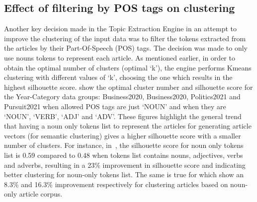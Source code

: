 \subsection{Effect of filtering by POS tags on clustering} \label{s:pos_clustering}
Another key decision made in the Topic Extraction Engine in an attempt to improve the clustering of the input data was to filter the tokens extracted from the articles by their Part-Of-Speech (POS) tags. The decision was made to only use nouns tokens to represent each article. As mentioned earlier, in order to obtain the optimal number of clusters (optimal `k'), the engine performs Kmeans clustering with different values of `k', choosing the one which results in the highest silhouette score.  show the optimal cluster number and silhouette score for the Year-Category data groups: Business2020, Business2020, Politics2021 and Pursuit2021 when allowed POS tags are just `NOUN' and when they are `NOUN', `VERB', `ADJ' and `ADV'. These figures highlight the general trend that having a noun only tokens list to represent the articles for generating article vectors (for semantic clustering) gives a higher silhouette score with a smaller number of clusters. For instance, in~, the silhouette score for noun only tokens list is 0.59 compared to 0.48 when tokens list contains nouns, adjectives, verbs and adverbs, resulting in a 23\% improvement in silhouette score and indicating better clustering for noun-only tokens list. The same is true for  which show an 8.3\% and 16.3\% improvement respectively for clustering articles based on noun-only article corpus.

